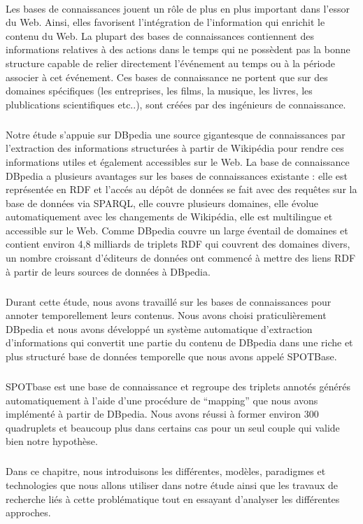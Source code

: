 \paragraph{}
Les bases de connaissances jouent un rôle de plus en plus important dans l'essor du Web. Ainsi, elles favorisent l'intégration de l'information qui enrichit le contenu du Web. La plupart des bases de connaissances contiennent des informations relatives à des actions dans le temps qui ne possèdent pas la bonne structure capable de relier directement l'événement au temps ou à la période associer à cet événement.
Ces bases de connaissance ne portent que sur des domaines spécifiques (les entreprises, les films, la musique, les livres, les plublications scientifiques etc..), sont créées par des ingénieurs de connaissance. 
\subparagraph{}
Notre étude s'appuie sur DBpedia une source gigantesque de connaissances par l'extraction des informations structurées à partir de Wikipédia pour rendre ces informations utiles et également accessibles sur le Web. La base de connaissance DBpedia a plusieurs avantages sur les bases de connaissances existante : elle est représentée en RDF et l'accés au dépôt de données se fait avec des requêtes sur la base de données via SPARQL, elle couvre plusieurs domaines, elle évolue automatiquement avec les changements de Wikipédia, elle est multilingue et accessible sur le Web. 
Comme DBpedia couvre un large éventail de domaines et contient environ 4,8 milliards de triplets RDF qui couvrent des domaines divers, un nombre croissant d'éditeurs de données ont commencé à mettre des liens RDF à partir de leurs sources de données à DBpedia.
\subparagraph{}
Durant cette étude, nous avons travaillé sur les bases de connaissances pour annoter temporellement leurs contenus. Nous avons choisi praticulièrement DBpedia et nous avons développé un système automatique d'extraction d'informations qui convertit une partie du contenu de DBpedia dans une riche et plus structuré base de données temporelle que nous avons appelé SPOTBase.
\subparagraph{}
SPOTbase est une base de connaissance et regroupe des triplets annotés générés automatiquement à l'aide d'une procédure de ``mapping'' que nous avons implémenté à partir de DBpedia.
Nous avons réussi à former environ $300$ quadruplets et beaucoup plus dans certains cas pour un seul couple qui valide bien notre hypothèse.
\subparagraph{}
Dans ce chapitre, nous introduisons les différentes, modèles, paradigmes et technologies que nous allons utiliser dans notre étude ainsi que les travaux de recherche liés à cette problématique tout en essayant d'analyser les différentes approches.
